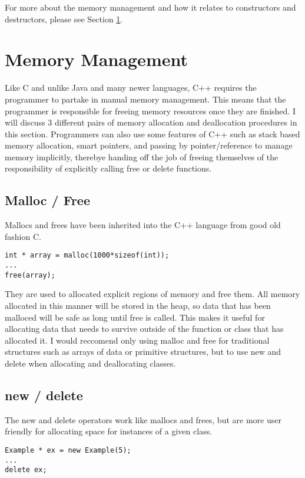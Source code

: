 \documentclass[12pt, letterpaper]{article}
\begin{document}
For more about the memory management and how it relates to constructors and destructors, please see Section \ref{MemManage}.

\section{Memory Management} \label{MemManage}

Like C and unlike Java and many newer languages, C++ requires the programmer to partake in manual memory management. This means that the programmer is responsible for freeing memory resources once they are finished. I will discuss 3 different pairs of memory allocation and deallocation procedures in this section. Programmers can also use some features of C++ such as stack based memory allocation, smart pointers, and passing by pointer/reference to manage memory implicitly, therebye handing off the job of freeing themselves of the responsibility of explicitly calling free or delete functions.

\subsection{Malloc / Free}

Mallocs and frees have been inherited into the C++ language from good old fashion C.
\begin{verbatim}
int * array = malloc(1000*sizeof(int));
...
free(array);
\end{verbatim}

They are used to allocated explicit regions of memory and free them. All memory allocated in this manner will be stored in the heap, so data that has been malloced will be safe as long until free is called. This makes it useful for allocating data that needs to survive outside of the function or class that has allocated it. I would reccomend only using malloc and free for traditional structures such as arrays of data or primitive structures, but to use new and delete when allocating and deallocating classes.

\subsection{new / delete}
The new and delete operators work like mallocs and frees, but are more user friendly for allocating space for instances of a given class.

\begin{verbatim}
Example * ex = new Example(5);
...
delete ex;
\end{verbatim}
\end{document}
